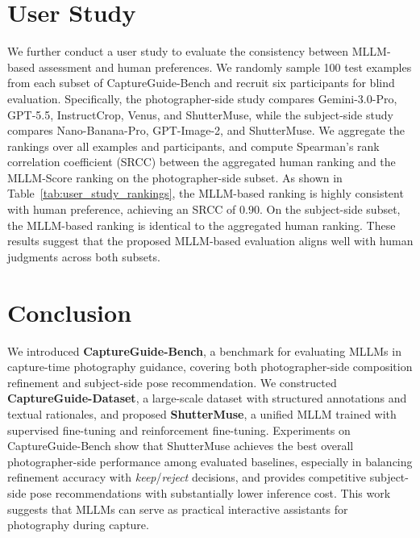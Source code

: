 \documentclass{llmxive}
\begin{document}
\section{User Study}
We further conduct a user study to evaluate the consistency between MLLM-based assessment and human preferences. We randomly sample 100 test examples from each subset of CaptureGuide-Bench and recruit six participants for blind evaluation. Specifically, the photographer-side study compares Gemini-3.0-Pro, GPT-5.5, InstructCrop, Venus, and ShutterMuse, while the subject-side study compares Nano-Banana-Pro, GPT-Image-2, and ShutterMuse. We aggregate the rankings over all examples and participants, and compute Spearman's rank correlation coefficient (SRCC) between the aggregated human ranking and the MLLM-Score ranking on the photographer-side subset. As shown in Table~\ref{tab:user_study_rankings}, the MLLM-based ranking is highly consistent with human preference, achieving an SRCC of $0.90$. On the subject-side subset, the MLLM-based ranking is identical to the aggregated human ranking. These results suggest that the proposed MLLM-based evaluation aligns well with human judgments across both subsets.
\section{Conclusion}

We introduced \textbf{CaptureGuide-Bench}, a benchmark for evaluating MLLMs in capture-time photography guidance, covering both photographer-side composition refinement and subject-side pose recommendation. We constructed \textbf{CaptureGuide-Dataset}, a large-scale dataset with structured annotations and textual rationales, and proposed \textbf{ShutterMuse}, a unified MLLM trained with supervised fine-tuning and reinforcement fine-tuning. Experiments on CaptureGuide-Bench show that ShutterMuse achieves the best overall photographer-side performance among evaluated baselines, especially in balancing refinement accuracy with \textit{keep}/\textit{reject} decisions, and provides competitive subject-side pose recommendations with substantially lower inference cost. This work suggests that MLLMs can serve as practical interactive assistants for photography during capture.

\end{document}
